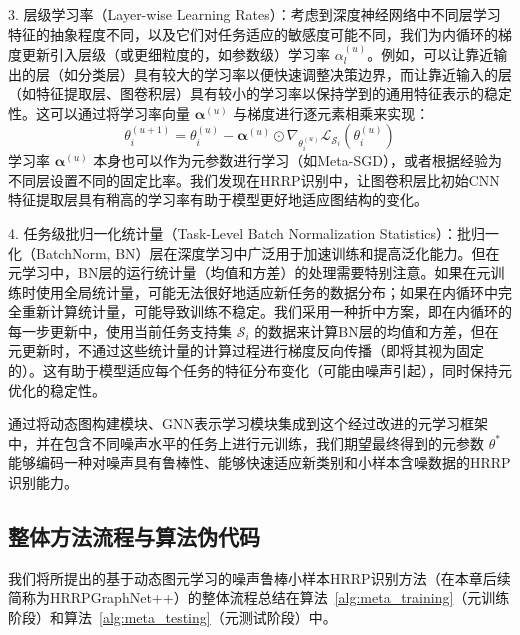 3.  层级学习率（Layer-wise Learning Rates）：考虑到深度神经网络中不同层学习特征的抽象程度不同，以及它们对任务适应的敏感度可能不同，我们为内循环的梯度更新引入层级（或更细粒度的，如参数级）学习率 $\alpha^{(u)}_l$。例如，可以让靠近输出的层（如分类层）具有较大的学习率以便快速调整决策边界，而让靠近输入的层（如特征提取层、图卷积层）具有较小的学习率以保持学到的通用特征表示的稳定性。这可以通过将学习率向量 $\boldsymbol{\alpha}^{(u)}$ 与梯度进行逐元素相乘来实现：
    \begin{equation}
        \theta_i^{(u+1)} = \theta_i^{(u)} - \boldsymbol{\alpha}^{(u)} \odot \nabla_{\theta_i^{(u)}} \mathcal{L}_{\mathcal{S}_i}(\theta_i^{(u)})
        \label{eq:layerwise_lr_update}
    \end{equation}
    学习率 $\boldsymbol{\alpha}^{(u)}$ 本身也可以作为元参数进行学习（如Meta-SGD），或者根据经验为不同层设置不同的固定比率。我们发现在HRRP识别中，让图卷积层比初始CNN特征提取层具有稍高的学习率有助于模型更好地适应图结构的变化。

4.  任务级批归一化统计量（Task-Level Batch Normalization Statistics）：批归一化（BatchNorm, BN）层在深度学习中广泛用于加速训练和提高泛化能力。但在元学习中，BN层的运行统计量（均值和方差）的处理需要特别注意。如果在元训练时使用全局统计量，可能无法很好地适应新任务的数据分布；如果在内循环中完全重新计算统计量，可能导致训练不稳定。我们采用一种折中方案，即在内循环的每一步更新中，使用当前任务支持集 $\mathcal{S}_i$ 的数据来计算BN层的均值和方差，但在元更新时，不通过这些统计量的计算过程进行梯度反向传播（即将其视为固定的）。这有助于模型适应每个任务的特征分布变化（可能由噪声引起），同时保持元优化的稳定性。

通过将动态图构建模块、GNN表示学习模块集成到这个经过改进的元学习框架中，并在包含不同噪声水平的任务上进行元训练，我们期望最终得到的元参数 $\theta^*$ 能够编码一种对噪声具有鲁棒性、能够快速适应新类别和小样本含噪数据的HRRP识别能力。

\subsection{整体方法流程与算法伪代码}
\label{subsec:algorithm}

我们将所提出的基于动态图元学习的噪声鲁棒小样本HRRP识别方法（在本章后续简称为HRRPGraphNet++）的整体流程总结在算法~\ref{alg:meta_training}（元训练阶段）和算法~\ref{alg:meta_testing}（元测试阶段）中。

